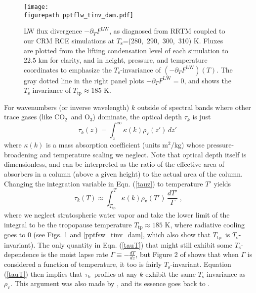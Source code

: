 \documentclass[10pt]{article}
\newcommand{\beqn}{\begin{equation}}
\newcommand{\eeqn}{\end{equation}}
\newcommand{\eqnref}[1]{(\ref{#1})}
\newcommand{\ppt}{\ensuremath{\partial_T}}
\newcommand{\cotwo}{\ensuremath{\mathrm{CO_2}}}
\newcommand{\othree}{\ensuremath{\mathrm{O_3}}}
\newcommand{\FLW}{\ensuremath{F^\mathrm{LW}}}
\newcommand{\tauk}{\ensuremath{\tau_k}}
\newcommand{\rhov}{\ensuremath{\rho_\mathrm{v}}}
\newcommand{\Ts}{\ensuremath{T_\mathrm{s}}}
\newcommand{\Ttp}{\ensuremath{T_\mathrm{tp}}}
\newcommand{\figurepath}{../figures/}
\begin{document}
\begin{figure}[t]
	\begin{center}
			\texttt{[image: \\figurepath pptflw\_tinv\_dam.pdf]}
		\caption{LW flux divergence  $-\ppt \FLW$, as diagnosed from RRTM coupled to our CRM RCE simulations at \Ts=(280,\ 290,\ 300,\ 310) K. Fluxes are plotted from the lifting condensation level of each simulation to 22.5 km for clarity, and  in height, pressure, and temperature coordinates to emphasize the \Ts-invariance of  $(-\ppt \FLW)(T)$. The gray dotted line in the right panel plots $-\ppt \FLW = 0$, and shows the \Ts-invariance of $\Ttp \approx 185$ K.
		\label{pptflw_tinv_dam}
		}
	\end{center}
\end{figure}

	 
	For wavenumbers (or inverse wavelength) $k$ outside of spectral bands where other trace gases (like \cotwo\ and \othree) dominate, the optical depth $\tauk$ is just
	\beqn
		\tau_k(z) = \int_z^\infty \kappa(k)  \rhov(z') \, dz'  \; 
		\label{tauz}
	\eeqn
		where $\kappa(k)$ is a  mass absorption coefficient  (units $\mathrm{m^2/kg}$) whose pressure-broadening and temperature scaling we neglect. Note that optical depth itself is dimensionless, and can be interpreted as the ratio of the effective area of absorbers in a column (above a given height) to the actual area of the column. Changing the integration variable in Eqn. \eqnref{tauz} to temperature $T'$  yields
		\beqn
		\tau_k(T) \approx \int_{\Ttp}^T \kappa(k)  \rhov(T') \, \frac{dT'}{\Gamma}  \; ,
		\label{tauT}
	\eeqn
	where we neglect stratospheric water vapor and take the lower limit of the integral to be the tropopause temperature $\Ttp \approx 185$ K, where radiative cooling goes to 0 (see Figs. \ref{pptflw_tinv_dam} and  \ref{pptfsw_tinv_dam}, which also show that \Ttp\ is \Ts-invariant). The only quantity in Eqn. \eqnref{tauT} that might still exhibit some \Ts-dependence is the  moist lapse rate $\Gamma\equiv -\frac{dT}{dz}$, but Figure 2 of \cite{ingram2010} shows that when $\Gamma$ is considered a function of temperature, it too is fairly  \Ts-invariant. Equation \eqnref{tauT} then implies that \tauk\ profiles at any $k$ exhibit the same \Ts-invariance as \rhov. This argument was also made by \cite{ingram2010}, and its essence goes back to  \cite{simpson1928}.
	
\end{document}
